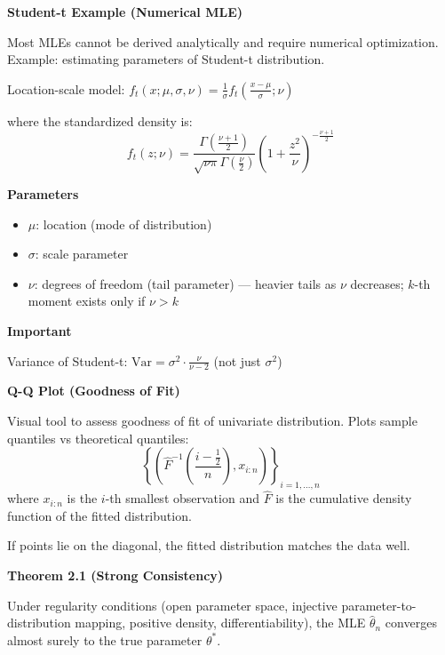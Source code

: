 \documentclass[12pt,a4paper]{article}
\begin{document}
\vspace{0.5em}

\textbf{Student-t Example (Numerical MLE)}

Most MLEs cannot be derived analytically and require numerical optimization. Example: estimating parameters of Student-t distribution.

Location-scale model: $f_t(x; \mu, \sigma, \nu) = \frac{1}{\sigma} f_t\left(\frac{x - \mu}{\sigma}; \nu\right)$

where the standardized density is:
\[
f_t(z; \nu) = \frac{\Gamma\left(\frac{\nu+1}{2}\right)}{\sqrt{\nu \pi} \Gamma\left(\frac{\nu}{2}\right)} \left(1 + \frac{z^2}{\nu}\right)^{-\frac{\nu+1}{2}}
\]

\textbf{Parameters}

\begin{itemize}
    \item \textbf{$\mu$}: location (mode of distribution)
    \item \textbf{$\sigma$}: scale parameter
    \item \textbf{$\nu$}: degrees of freedom (tail parameter) — heavier tails as $\nu$ decreases; $k$-th moment exists only if $\nu > k$
\end{itemize}

\textbf{Important}

Variance of Student-t: $\text{Var} = \sigma^2 \cdot \frac{\nu}{\nu - 2}$ (not just $\sigma^2$)

\vspace{0.5em}

\textbf{Q-Q Plot (Goodness of Fit)}

Visual tool to assess goodness of fit of univariate distribution. Plots sample quantiles vs theoretical quantiles:
\[
\left\{\left(\hat{F}^{-1}\left(\frac{i - \frac{1}{2}}{n}\right), x_{i:n}\right)\right\}_{i=1,\ldots,n}
\]
where $x_{i:n}$ is the $i$-th smallest observation and $\hat{F}$ is the cumulative density function of the fitted distribution.

If points lie on the diagonal, the fitted distribution matches the data well.

\vspace{0.5em}

\textbf{Theorem 2.1 (Strong Consistency)}

Under regularity conditions (open parameter space, injective parameter-to-distribution mapping, positive density, differentiability), the MLE $\hat{\theta}_n$ converges almost surely to the true parameter $\theta^*$.
\end{document}
